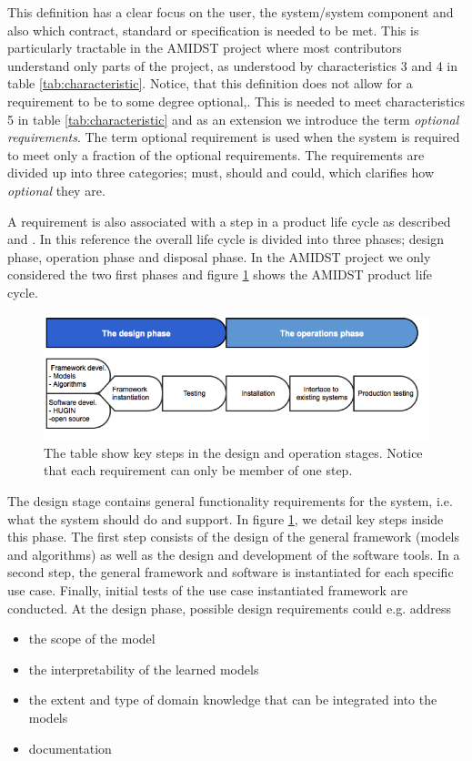 \documentclass[11pt, oneside]{article}   	%
\begin{document}
This definition has a clear focus on the user, the system/system component and also which contract, standard or specification is needed to be met.  This is particularly tractable in the AMIDST project where most contributors understand only parts of the project, as understood by characteristics 3 and 4 in table \ref{tab:characteristic}. Notice, that this definition does not allow for a requirement to be to some degree optional,.  This is needed to meet characteristics 5 in table \ref{tab:characteristic} and as an extension we introduce the term \emph{optional requirements}. The term optional requirement is used when the system is required to meet only a fraction of the optional requirements.  The requirements are divided up into three categories; must, should and could, which clarifies how \emph{optional} they are.

A requirement is also associated with a step in a product life cycle as described and \cite{Eig09}.  In this reference the overall life cycle is divided into three phases; design phase, operation phase and disposal phase.  In the AMIDST project we only considered the two first phases and figure \ref{REprocess2} shows the AMIDST product life cycle.

\begin{figure}
\centering
\includegraphics [keepaspectratio,width = 14cm] {REprocess2}
\caption{The table show key steps in the design and operation stages. Notice that each requirement can only be member of one step.}
\label{REprocess2}
\end{figure}

The design stage contains general functionality requirements for the system, i.e. what the system should do and support.  In figure \ref{REprocess2}, we detail key steps inside this phase. The first step consists of the design of the general framework (models and algorithms) as well as the design and development of the software tools. In a second step, the general framework and software is instantiated for each specific use case. Finally, initial tests of the use case instantiated framework are conducted.  At the design phase, possible design requirements could e.g. address
\begin{itemize}
 \item the scope of the model
 \item the interpretability of the learned models
 \item the extent and type of domain knowledge that can be integrated into the models
 \item documentation
\end{itemize}
\end{document}
